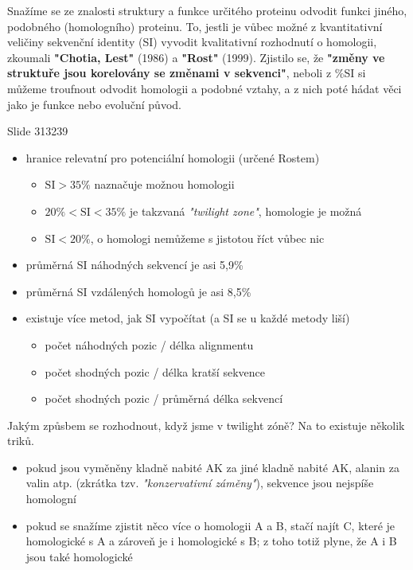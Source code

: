 \documentclass[DIV=8]{scrreprt}
\begin{document}
Snažíme se ze znalosti struktury a funkce určitého proteinu odvodit funkci jiného, podobného (homologního) proteinu. To, jestli je vůbec možné z kvantitativní veličiny sekvenční identity (SI) vyvodit kvalitativní rozhodnutí o homologii, zkoumali \textbf{"Chotia, Lest"} (1986) a \textbf{"Rost"} (1999). Zjistilo se, že \textbf{"změny ve struktuře jsou korelovány se změnami v sekvenci"}, neboli z \%SI si můžeme troufnout odvodit homologii a podobné vztahy, a z nich poté hádat věci jako je funkce nebo evoluční původ.

Slide 313239
\begin{itemize}
    \item hranice relevatní pro potenciální homologii (určené Rostem)
\begin{itemize}
    \item \(\text{SI} > 35\%\) naznačuje možnou homologii
    \item \(20\% < \text{SI} < 35\%\) je takzvaná \emph{"twilight zone"}, homologie je možná
    \item \(\text{SI} < 20\%\), o homologi nemůžeme s jistotou říct vůbec nic
\end{itemize}

    \item průměrná SI náhodných sekvencí je asi 5,9\%
    \item průměrná SI vzdálených homologů je asi 8,5\%
    \item existuje více metod, jak SI vypočítat (a SI se u každé metody liší)
\begin{itemize}
    \item počet náhodných pozic / délka alignmentu
    \item počet shodných pozic / délka kratší sekvence
    \item počet shodných pozic / průměrná délka sekvencí
\end{itemize}

\end{itemize}


Jakým způsbem se rozhodnout, když jsme v twilight zóně? Na to existuje několik triků.

\begin{itemize}
    \item pokud jsou vyměněny kladně nabité AK za jiné kladně nabité AK, alanin za valin atp. (zkrátka tzv. \emph{"konzervativní záměny"}), sekvence jsou nejspíše homologní
    \item pokud se snažíme zjistit něco více o homologii A a B, stačí najít C, které je homologické s A a zároveň je i homologické s B; z toho totiž plyne, že A i B jsou také homologické
\end{itemize}
\end{document}

